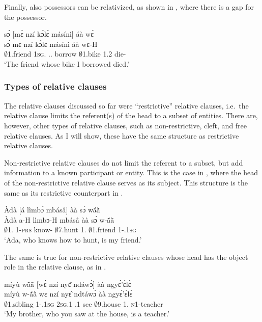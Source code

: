 Finally, also possessors can be relativized, as shown in , where there is a gap for the possessor. 


\ea\label{SREL8} 
  \glll sɔ́ [mɛ̀ nzí kɔ̀lɛ̀ másínì]\textsubscript{{\REL}} áà wɛ́\\
         sɔ́ {\db}mɛ nzí kɔ̀lɛ másínì áà wɛ-H \\
         $\emptyset$1.friend {\db}1\textsc{sg}.{\PST} {\PROG}.{\PST}.{\R} borrow $\emptyset$1.bike 1.{\PST}2 die-{\PST} \\
    \trans `The friend whose bike I borrowed died.'
\z




\subsubsection{Types of relative clauses}
\label{sec:RELtype}


The relative clauses discussed so far were ``restrictive'' relative clauses, i.e.\ the relative clause limits the referent(s) of the head to a subset of entities.
There are, however, other types of relative clauses, such as non-restrictive, cleft, and free relative clauses. As I will show, these have the same structure as restrictive relative clauses.

Non-restrictive relative clauses do not limit the referent to a subset, but add information to a known participant or entity. This is the case in , where the head of the non-restrictive relative clause serves as its subject. This structure is the same as its restrictive counterpart in .


\ea\label{TREL1}
  \glll   Àdà [á lìmbɔ́ mbásâ]\textsubscript{{\REL}} àà sɔ́ wã́ã̀ \\
         Àdà {\db}a-H lìmbɔ-H mbásâ àà sɔ́ w-ã́ã̀ \\
         $\emptyset$1.{\PN} {\db}1-\textsc{prs} know-{\R} $\emptyset$7.hunt 1.{\COP} $\emptyset$1.friend 1-{\POSS}.1\textsc{sg}  \\
    \trans `Ada, who knows how to hunt, is my friend.'
\z

The same is true for non-restrictive relative clauses whose head has the object role in the relative clause, as in .


\ea\label{TREL2}
  \glll míyù wã́ã̀ [wɛ̀ nzí nyɛ̂ ndáwɔ̀]\textsubscript{{\REL}} àà ngyɛ́'ɛ̀lɛ̀ \\
          míyù w-ã́ã̀ {\db}wɛ nzí nyɛ̂ ndtáwɔ̀ àà ngyɛ́'ɛ̀lɛ̀ \\
         $\emptyset$1.sibling 1-{\POSS}.1\textsc{sg} {\db}2\textsc{sg}.{\PST}1 {\PROG}.{\PST}1 see $\emptyset$9.house 1.{\COP} \textsc{n}1-teacher\\
    \trans `My brother, who you saw at the house, is a teacher.'
\z



